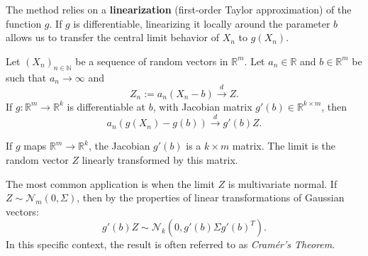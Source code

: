 The method relies on a \textbf{linearization} (first-order Taylor approximation) of the function $g$. If $g$ is differentiable, linearizing it locally around the parameter $b$ allows us to transfer the central limit behavior of $X_n$ to $g(X_n)$.

\begin{theo}\label{thm:delta_method}
Let $(X_n)_{n\in\mathbb{N}}$ be a sequence of random vectors in $\mathbb{R}^m$. Let $a_n \in \mathbb{R}$ and $b \in \mathbb{R}^m$ be such that $a_n \to \infty$ and
\[ Z_n := a_n(X_n - b) \xrightarrow{d} Z. \]
If $g : \mathbb{R}^m \to \mathbb{R}^k$ is differentiable at $b$, with Jacobian matrix $g'(b) \in \mathbb{R}^{k \times m}$, then
\[ a_n(g(X_n) - g(b)) \xrightarrow{d} g'(b)Z. \]
\end{theo}

\begin{note}[on Dimensions]
If $g$ maps $\mathbb{R}^m \to \mathbb{R}^k$, the Jacobian $g'(b)$ is a $k \times m$ matrix. The limit is the random vector $Z$ linearly transformed by this matrix.
\end{note}

\begin{note}
The most common application is when the limit $Z$ is multivariate normal. If $Z \sim \mathcal{N}_m(0, \Sigma)$, then by the properties of linear transformations of Gaussian vectors:
\[ g'(b)Z \sim \mathcal{N}_k(0, g'(b)\Sigma g'(b)^T). \]
In this specific context, the result is often referred to as \emph{Cramér's Theorem}.
\end{note}

